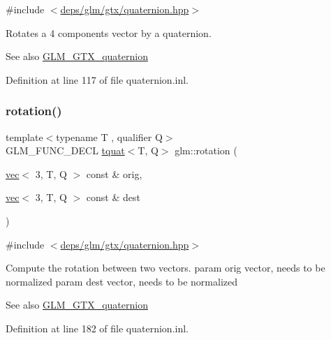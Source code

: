 {\ttfamily \#include $<$\hyperlink{gtx_2quaternion_8hpp}{deps/glm/gtx/quaternion.\+hpp}$>$}

Rotates a 4 components vector by a quaternion.

\begin{DoxySeeAlso}{See also}
\hyperlink{group__gtx__quaternion}{G\+L\+M\+\_\+\+G\+T\+X\+\_\+quaternion} 
\end{DoxySeeAlso}


Definition at line 117 of file quaternion.\+inl.

\mbox{\label{group__gtx__quaternion_ga5a729f33cbd904c9ca14cdf25d0a07e4}} 
\subsubsection{\texorpdfstring{rotation()}{rotation()}}
{\footnotesize\ttfamily template$<$typename T , qualifier Q$>$ \\
G\+L\+M\+\_\+\+F\+U\+N\+C\+\_\+\+D\+E\+CL \hyperlink{structglm_1_1tquat}{tquat}$<$T, Q$>$ glm\+::rotation (\begin{DoxyParamCaption}\item[{\hyperlink{structglm_1_1vec}{vec}$<$ 3, T, Q $>$ const \&}]{orig,  }\item[{\hyperlink{structglm_1_1vec}{vec}$<$ 3, T, Q $>$ const \&}]{dest }\end{DoxyParamCaption})}



{\ttfamily \#include $<$\hyperlink{gtx_2quaternion_8hpp}{deps/glm/gtx/quaternion.\+hpp}$>$}

Compute the rotation between two vectors. param orig vector, needs to be normalized param dest vector, needs to be normalized

\begin{DoxySeeAlso}{See also}
\hyperlink{group__gtx__quaternion}{G\+L\+M\+\_\+\+G\+T\+X\+\_\+quaternion} 
\end{DoxySeeAlso}


Definition at line 182 of file quaternion.\+inl.

\mbox{\label{group__gtx__quaternion_gaf0ad63ac791b1f9a587e363837c2d538}} 
